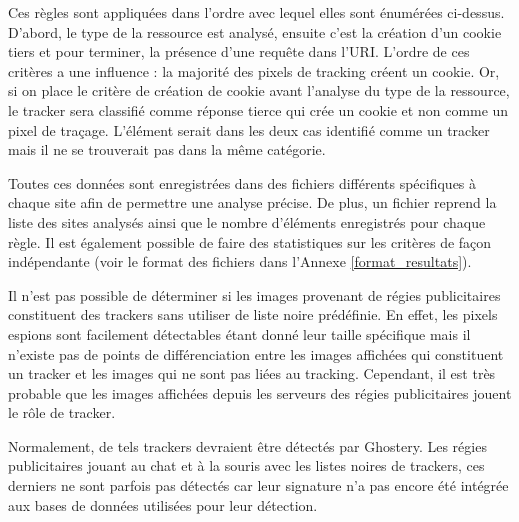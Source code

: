 Ces règles sont appliquées dans l'ordre avec lequel elles sont énumérées ci-dessus. D'abord, le type de la ressource est analysé, ensuite c'est la création d'un cookie tiers et pour terminer, la présence d'une requête dans l'URI. L'ordre de ces critères a une influence : la majorité des pixels de tracking créent un cookie. Or, si on place le critère de création de cookie avant l'analyse du type de la ressource, le tracker sera classifié comme réponse tierce qui crée un cookie et non comme un pixel de traçage. L'élément serait dans les deux cas identifié comme un tracker mais il ne se trouverait pas dans la même catégorie.
\newline

Toutes ces données sont enregistrées dans des fichiers différents spécifiques à chaque site afin de permettre une analyse précise. De plus, un fichier reprend la liste des sites analysés ainsi que le nombre d'éléments enregistrés pour chaque règle. Il est également possible de faire des statistiques sur les critères de façon indépendante (voir le format des fichiers dans l'Annexe \ref{format_resultats}).
\newline

Il n'est pas possible de déterminer si les images provenant de régies publicitaires constituent des trackers sans utiliser de liste noire prédéfinie. En effet, les pixels espions sont facilement détectables étant donné leur taille spécifique mais il n'existe pas de points de différenciation entre les images affichées qui constituent un tracker et les images qui ne sont pas liées au tracking. Cependant, il est très probable que les images affichées depuis les serveurs des régies publicitaires jouent le rôle de tracker.

Normalement, de tels trackers devraient être détectés par Ghostery. Les régies publicitaires jouant au chat et à la souris avec les listes noires de trackers, ces derniers ne sont parfois pas détectés car leur signature n'a pas encore été intégrée aux bases de données utilisées pour leur détection.

